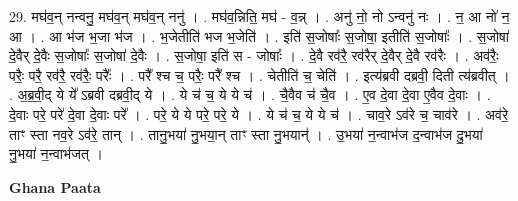 \documentclass[17pt]{extarticle}
\begin{document}
29. मघ॑व॒न् नन्वनु॒ मघ॑व॒न् मघ॑व॒न् ननु॑ । . मघ॑व॒न्निति॒ मघ॑ - व॒न्न् । . अनु॑ नो॒ नो ऽन्वनु॑ नः । . न॒ आ नो॑ न॒ आ । . आ भ॑ज भ॒जा भ॑ज । . भ॒जेतीति॑ भज भ॒जेति॑ । . इति॑ स॒जोषाः᳚ स॒जोषा॒ इतीति॑ स॒जोषाः᳚ । . स॒जोषा॑ दे॒वैर् दे॒वैः स॒जोषाः᳚ स॒जोषा॑ दे॒वैः । . स॒जोषा॒ इति॑ स - जोषाः᳚ । . दे॒वै रव॑रै॒ रव॑रैर् दे॒वैर् दे॒वै रव॑रैः । . अव॑रैः॒ परैः॒ परै॒ रव॑रै॒ रव॑रैः॒ परैः᳚ । . परै᳚ श्च च॒ परैः॒ परै᳚ श्च । . चेतीति॑ च॒ चेति॑ । . इत्य॑ब्रवी दब्रवी॒ दिती त्य॑ब्रवीत् । . अ॒ब्र॒वी॒द् ये ये᳚ ऽब्रवी दब्रवी॒द् ये । . ये च॑ च॒ ये ये च॑ । . चै॒वैव च॑ चै॒व । . ए॒व दे॒वा दे॒वा ए॒वैव दे॒वाः । . दे॒वाः परे॒ परे॑ दे॒वा दे॒वाः परे᳚ । . परे॒ ये ये परे॒ परे॒ ये । . ये च॑ च॒ ये ये च॑ । . चाव॒रे ऽव॑रे च॒ चाव॑रे । . अव॑रे॒ ताꣳ स्ता नव॒रे ऽव॑रे॒ तान् । . तानु॒भया॑ नु॒भया॒न् ताꣳ स्ता नु॒भयान्॑ । . उ॒भया॑ न॒न्वाभ॑ज द॒न्वाभ॑ज दु॒भया॑ नु॒भया॑ न॒न्वाभ॑जत् । \newline

\textbf{Ghana Paata } \newline
\end{document}

